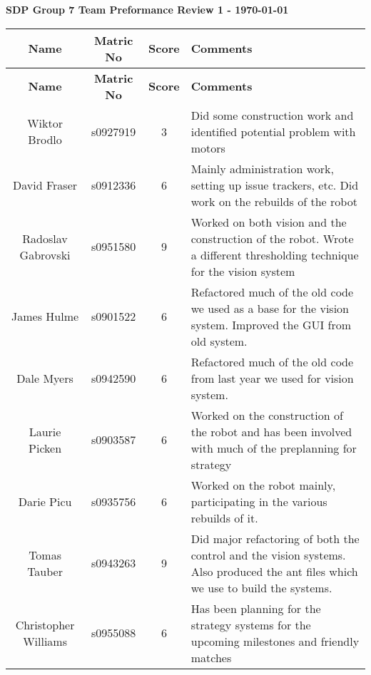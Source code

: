 \documentclass[12pt, a4paper]{article} %
\begin{document}
\textbf{SDP Group 7 Team Preformance Review 1 - \today}

\begin{longtable}{c c c p{18cm}}
    \textbf{Name} &
    \textbf{Matric No} &
    \textbf{Score} &
    \textbf{Comments}\\
    \hline
    \endfirsthead


    \textbf{Name} &
    \textbf{Matric No} &
    \textbf{Score} &
    \textbf{Comments}\\
    \hline
    \endhead

    Wiktor Brodlo &
    s0927919 &
    3&
    Did some construction work and identified potential problem with motors\\

    David Fraser &
    s0912336 &
    6&
    Mainly administration work, setting up issue trackers, etc. Did work on the
    rebuilds of the robot\\

    Radoslav Gabrovski &
    s0951580 &
    9& 
    Worked on both vision and the construction of the robot. Wrote a different
    thresholding technique for the vision system\\

    James Hulme &
    s0901522 &
    6& 
    Refactored much of the old code we used as a base for the vision system.
    Improved the GUI from old system.\\

    Dale Myers &
    s0942590 &
    6&
    Refactored much of the old code from last year we used for vision system. \\

    Laurie Picken &
    s0903587 &
    6&
    Worked on the construction of the robot and has been involved with much of
    the preplanning for strategy\\

    Darie Picu &
    s0935756 &
    6&
    Worked on the robot mainly, participating in the various rebuilds of it.\\

    Tomas Tauber &
    s0943263 &
    9&
    Did major refactoring of both the control and the vision systems. Also
    produced the ant files which we use to build the systems.\\

    Christopher Williams &
    s0955088 &
    6&
    Has been planning for the strategy systems for the upcoming milestones and
    friendly matches\\


\end{longtable}
\end{document}
